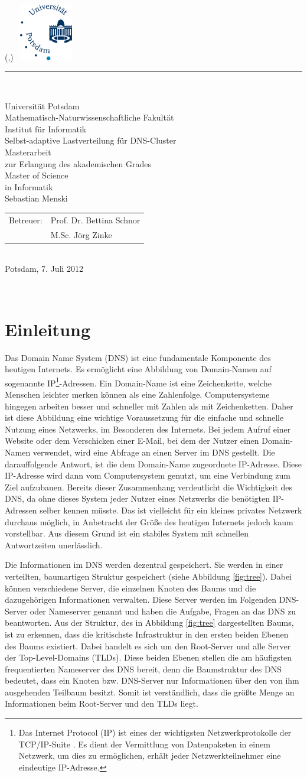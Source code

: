 \documentclass[a4paper, 12pt, BCOR10mm, DIV12, toc=bibliography, toc=listof, german]{scrbook}
\newlength{\TitleMargin}
\newlength{\TitleWidth}
\newcommand{\TitleUni}{Universität Potsdam}
\newcommand{\TitleInstitut}{Mathematisch-Naturwissenschaftliche Fakultät\\Institut für Informatik}
\newcommand{\TitleTitel}{Selbst-adaptive Lastverteilung für DNS-Cluster}
\newcommand{\TitleTyp}{Masterarbeit}
\newcommand{\TitleAutor}{Sebastian Menski}
\newcommand{\TitleBetreuerText}{Betreuer}
\newcommand{\TitleBetreuer}{Prof. Dr. Bettina Schnor\\ &M.Sc. Jörg Zinke}
\newcommand{\TitleAbschlussText}{zur Erlangung des akademischen Grades\\Master of Science\\in Informatik}
\newcommand{\TitleOrt}{Potsdam}
\newcommand{\TitleDatum}{7. Juli 2012}
\renewcommand{\maketitle}{
	\thispagestyle{empty}
	\begin{textblock*}{\TitleWidth}(\TitleMargin,\TitleMargin)
		~\hfill\includegraphics[height=2.5cm]{images/uni-logo}\\[3mm]
		{\color{uniblue}\rule{\TitleWidth}{1mm}}\\[5mm]
		{
			\centering
			\sffamily\Large
			{\LARGE\TitleUni}\\[0.5\baselineskip]
			{\large\TitleInstitut}\\[5\baselineskip]
			{\Huge\TitleTitel}\\[3\baselineskip]

			{\TitleTyp}\\
			\TitleAbschlussText\\[3\baselineskip]

			\TitleAutor\\[3\baselineskip]
			\begin{tabular}{rl}
				\TitleBetreuerText: & \TitleBetreuer
			\end{tabular}\\[2\baselineskip]
			\TitleOrt, \TitleDatum\par
		}
	\end{textblock*}
	~\clearpage
}
\def \dns {Domain Name System (DNS)}
\begin{document}
	\frontmatter
	\maketitle{}
	\tableofcontents{}

	\onehalfspacing{}
	\mainmatter
	\pagestyle{scrheadings}

	\chapter{Einleitung} %
	\label{cha:einleitung}

		Das \dns{} \cite{rfc1034, rfc1035} ist eine fundamentale Komponente des heutigen Internets.  Es
		ermöglicht eine Abbildung von Domain-Namen auf sogenannte IP\footnote{Das Internet Protocol (IP)
		\cite{rfc791} ist eines der wichtigsten Netzwerkprotokolle der TCP/IP-Suite
		\cite{stevens1994}. Es dient der Vermittlung von Datenpaketen in einem Netzwerk, um dies zu
		ermöglichen, erhält jeder Netzwerkteilnehmer eine eindeutige IP-Adresse.}-Adressen. Ein
		Domain-Name ist eine Zeichenkette, welche Menschen leichter merken können als eine
		Zahlenfolge.  Computersysteme hingegen arbeiten besser und schneller mit Zahlen als mit
		Zeichenketten.  Daher ist diese Abbildung eine wichtige Voraussetzung für die einfache
		und schnelle Nutzung eines Netzwerks, im Besonderen des Internets. Bei jedem Aufruf einer
		Website oder dem Verschicken einer E-Mail, bei dem der Nutzer einen Domain-Namen verwendet, wird
		eine Abfrage an einen Server im DNS gestellt. Die darauffolgende Antwort, ist die dem
		Domain-Name zugeordnete IP-Adresse. Diese IP-Adresse wird dann vom Computersystem genutzt, um
		eine Verbindung zum Ziel aufzubauen. Bereits dieser Zusammenhang verdeutlicht die Wichtigkeit
		des DNS, da ohne dieses System jeder Nutzer eines Netzwerks die benötigten IP-Adressen
		selber kennen müsste. Das ist vielleicht für ein kleines privates Netzwerk durchaus möglich, in
		Anbetracht der Größe des heutigen Internets jedoch	kaum vorstellbar. Aus diesem Grund ist ein
		stabiles System mit schnellen Antwortzeiten unerlässlich.

		Die Informationen im DNS werden dezentral gespeichert. Sie werden in einer verteilten,
		baumartigen Struktur gespeichert (siehe Abbildung \ref{fig:tree}). Dabei können verschiedene
		Server, die einzelnen Knoten des Baums und die dazugehörigen Informationen verwalten. Diese
		Server werden im Folgenden DNS-Server oder Nameserver genannt und haben die Aufgabe, Fragen an
		das DNS zu beantworten. Aus der Struktur, des in Abbildung \ref{fig:tree} dargestellten Baums, ist
		zu erkennen, dass die kritischste Infrastruktur in den ersten beiden Ebenen des Baums existiert.
		Dabei handelt es sich um den Root-Server und alle Server der Top-Level-Domains (TLDs). Diese
		beiden Ebenen stellen die am häufigsten frequentierten Nameserver des DNS bereit, denn die Baumstruktur
		des DNS bedeutet, dass ein Knoten bzw. DNS-Server nur Informationen über den von ihm ausgehenden
		Teilbaum besitzt. Somit ist verständlich, dass die größte Menge an Informationen beim Root-Server
		und den TLDs liegt.
\end{document}
